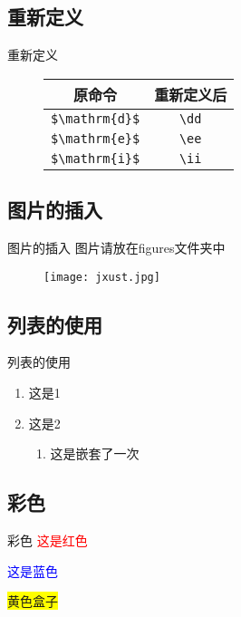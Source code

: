 \documentclass{jxustbeamer}
\begin{document}
\subsection{重新定义}
\begin{frame}[fragile]{重新定义}
	\begin{figure}[h]
		\begin{tabular}{|c|c|}
			\hline
			原命令 & 重新定义后\\
			\hline
			\verb|$\mathrm{d}$| & \verb|\dd|\\
			\hline
			\verb|$\mathrm{e}$| & \verb|\ee|\\
			\hline
			\verb|$\mathrm{i}$| & \verb|\ii|\\
			\hline
		\end{tabular}
	\end{figure}
\end{frame}
\subsection{图片的插入}
\begin{frame}{图片的插入}
	图片请放在figures文件夹中
	\begin{figure}[h]
		\centering
		\texttt{[image: jxust.jpg]}
	\end{figure}
	
\end{frame}
\subsection{列表的使用}
\begin{frame}{列表的使用}
	\begin{enumerate}
		\item 这是1
		\item 这是2
		\begin{enumerate}
			\item 这是嵌套了一次
		\end{enumerate}
	\end{enumerate}
\end{frame}

\subsection{彩色}
\begin{frame}{彩色}
	\textcolor{red}{这是红色}
	
	\textcolor{blue}{这是蓝色}
	
	\colorbox{yellow}{黄色盒子}
	
\end{frame}
\end{document}
